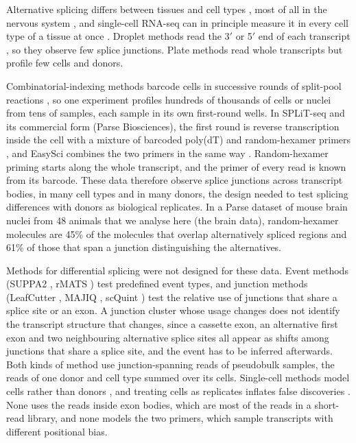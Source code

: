 \documentclass[11pt]{article}
\begin{document}
Alternative splicing differs between tissues and cell types \cite{wang2008}, most of all in the nervous system \cite{raj2015}, and single-cell RNA-seq can in principle measure it in every cell type of a tissue at once \cite{arzalluzluque2018}. Droplet methods read the 3$'$ or 5$'$ end of each transcript \cite{zheng2017}, so they observe few splice junctions. Plate methods read whole transcripts \cite{picelli2013,hagemannjensen2020} but profile few cells and donors.

Combinatorial-indexing methods barcode cells in successive rounds of split-pool reactions \cite{cao2017,rosenberg2018,cao2019,martin2023,sziraki2023}, so one experiment profiles hundreds of thousands of cells or nuclei from tens of samples, each sample in its own first-round wells. In SPLiT-seq and its commercial form (Parse Biosciences), the first round is reverse transcription inside the cell with a mixture of barcoded poly(dT) and random-hexamer primers \cite{rosenberg2018}, and EasySci combines the two primers in the same way \cite{sziraki2023}. Random-hexamer priming starts along the whole transcript, and the primer of every read is known from its barcode. These data therefore observe splice junctions across transcript bodies, in many cell types and in many donors, the design needed to test splicing differences with donors as biological replicates. In a Parse dataset of mouse brain nuclei from 48 animals that we analyse here (the brain data), random-hexamer molecules are 45\% of the molecules that overlap alternatively spliced regions and 61\% of those that span a junction distinguishing the alternatives.

Methods for differential splicing were not designed for these data. Event methods (SUPPA2 \cite{trincado2018}, rMATS \cite{shen2014}) test predefined event types, and junction methods (LeafCutter \cite{li2018}, MAJIQ \cite{vaquerogarcia2016,vaquerogarcia2023}, scQuint \cite{benegas2022}) test the relative use of junctions that share a splice site or an exon. A junction cluster whose usage changes does not identify the transcript structure that changes, since a cassette exon, an alternative first exon and two neighbouring alternative splice sites all appear as shifts among junctions that share a splice site, and the event has to be inferred afterwards. Both kinds of method use junction-spanning reads of pseudobulk samples, the reads of one donor and cell type summed over its cells. Single-cell methods model cells rather than donors \cite{huang2021,buenabadnajar2022}, and treating cells as replicates inflates false discoveries \cite{squair2021,zimmerman2021}. None uses the reads inside exon bodies, which are most of the reads in a short-read library, and none models the two primers, which sample transcripts with different positional bias.
\end{document}
